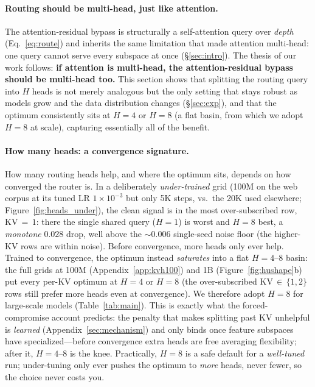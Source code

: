 \documentclass{article}
\begin{document}
\paragraph{Routing should be multi-head, just like attention.}
The attention-residual bypass is structurally a self-attention query over
\emph{depth} (Eq.~\ref{eq:route}) and inherits the same limitation that made
attention multi-head: one query cannot serve every subspace at once
(\S\ref{sec:intro}). The thesis of our work follows: \textbf{if attention is
multi-head, the attention-residual bypass should be multi-head too.} This section
shows that splitting the routing query into $H$ heads is not merely analogous but
the only setting that stays robust as models grow and the data distribution
changes (\S\ref{sec:exp}), and that the optimum consistently sits at $H{=}4$ or
$H{=}8$ (a flat basin, from which we adopt $H{=}8$ at scale), capturing essentially all
of the benefit.


\paragraph{How many heads: a convergence signature.}
How many routing heads help, and where the optimum sits, depends on how converged the
router is. In a deliberately \emph{under-trained} grid (100M on the web corpus
at its tuned LR
$1\times10^{-3}$ but only 5K steps, vs.\ the 20K used elsewhere;
Figure~\ref{fig:heads_under}), the clean signal is in the most over-subscribed row,
KV$\,{=}\,1$: there the single shared query ($H{=}1$) is worst and $H{=}8$ best, a
\emph{monotone} $0.028$ drop, well above the $\sim\!0.006$ single-seed noise floor
(the higher-KV rows are within noise). Before convergence, more heads only ever help.
Trained to convergence, the optimum instead \emph{saturates} into a flat
$H{=}4$--$8$ basin: the full
grids at 100M
(Appendix~\ref{app:kvh100}) and 1B (Figure~\ref{fig:hushape}b) put every per-KV optimum at $H{=}4$ or $H{=}8$
(the over-subscribed KV$\,{\in}\,\{1,2\}$ rows still prefer more heads
even at convergence). We therefore adopt $H{=}8$ for large-scale models (Table~\ref{tab:main}).
This is exactly what the forced-compromise account predicts: the penalty that makes
splitting past KV unhelpful is \emph{learned} (Appendix~\ref{sec:mechanism}) and only
binds once feature subspaces have specialized---before convergence extra heads are
free averaging flexibility; after it, $H{=}4$--$8$ is the knee. Practically,
$H{=}8$ is a safe default for a \emph{well-tuned} run; under-tuning only ever
pushes the optimum to \emph{more} heads, never fewer, so the choice
never costs you.
\end{document}
